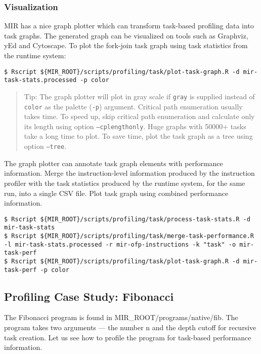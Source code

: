 \documentclass[11pt,a4paper]{article}
\begin{document}
\subsubsection{Visualization}

MIR has a nice graph plotter which can transform task-based profiling data into task graphs. The generated graph can be visualized on tools such as Graphviz, yEd and Cytoscape.  To plot the fork-join task graph using task statistics from the runtime system: 

\begin{lstlisting}[style=MyInputStyle]
$ Rscript ${MIR_ROOT}/scripts/profiling/task/plot-task-graph.R -d mir-task-stats.processed -p color
\end{lstlisting}

\begin{framed}
\begin{quote}
Tip: The graph plotter will plot in gray scale if \texttt{gray} is supplied instead of \texttt{color} as the palette (\texttt{-p}) argument. Critical path enumeration usually takes time. To speed up, skip critical path enumeration and calculate only its length using option \texttt{--cplengthonly}. Huge graphs with 50000+ tasks take a long time to plot. To save time, plot the task graph as a tree using option \texttt{--tree}.
\end{quote}
\end{framed}

The graph plotter can annotate task graph elements with performance information. Merge the instruction-level information produced by the instruction profiler with the task statistics produced by the runtime system, for the same run, into a single CSV file. Plot task graph using combined performance information.

\begin{lstlisting}[style=MyInputStyle]
$ Rscript ${MIR_ROOT}/scripts/profiling/task/process-task-stats.R -d mir-task-stats
$ Rscript ${MIR_ROOT}/scripts/profiling/task/merge-task-performance.R -l mir-task-stats.processed -r mir-ofp-instructions -k "task" -o mir-task-perf
$ Rscript ${MIR_ROOT}/scripts/profiling/task/plot-task-graph.R -d mir-task-perf -p color
\end{lstlisting}

\subsection{Profiling Case Study: Fibonacci}

The Fibonacci program is found in MIR\_ROOT/programs/native/fib. The program takes two arguments --- the number n and the depth cutoff for recursive task creation. Let us see how to profile the program for task-based performance information.  
\end{document}
